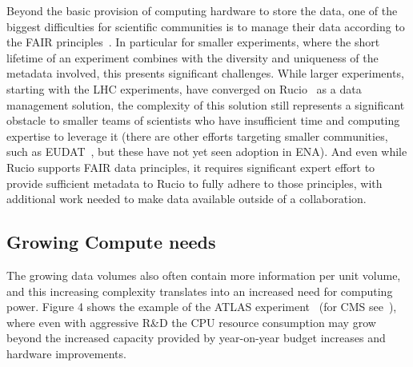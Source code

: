 Beyond the basic provision of computing hardware to store the data, one of the biggest difficulties for scientific communities is to manage their data according to the FAIR principles~\cite{Wilkinson2016}. In particular for smaller experiments, where the short lifetime of an experiment combines with the diversity and uniqueness of the metadata involved, this presents significant challenges.  While larger experiments, starting with the LHC experiments, have converged on Rucio~\cite{Barisits2019} as a data management solution, the complexity of this solution still represents a significant obstacle to smaller teams of scientists who have insufficient time and computing expertise to leverage it (there are other efforts targeting smaller communities, such as EUDAT~\cite{EUDAT}, but these have not yet seen adoption in ENA). And even while Rucio supports FAIR data principles, it requires significant expert effort to provide sufficient metadata to Rucio to fully adhere to those principles, with additional work needed to make data available outside of a collaboration.

\subsection{Growing Compute needs}

The growing data volumes also often contain more information per unit volume, and this increasing complexity translates into an increased need for computing power.  Figure 4 shows the example of the ATLAS experiment~\cite{CERN-LHCC-2022-005} (for CMS see~\cite{Software:2815292}), where even with aggressive R\&D the CPU resource consumption may grow beyond the increased capacity provided by year-on-year budget increases and hardware improvements.


